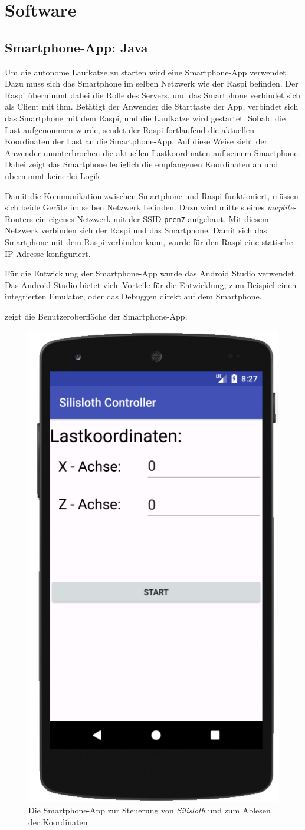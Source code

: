 \section{Software}

\subsection{Smartphone-App: Java}
\label{sec:smartphoneapp}

Um die autonome Laufkatze zu starten wird eine Smartphone-App verwendet. Dazu muss sich das Smartphone im selben Netzwerk wie der Raspi befinden. Der Raspi übernimmt dabei die Rolle des Servers, und das Smartphone verbindet sich als Client mit ihm. Betätigt der Anwender die Starttaste der App, verbindet sich das Smartphone mit dem Raspi, und die Laufkatze wird gestartet. Sobald die Last aufgenommen wurde, sendet der Raspi fortlaufend die aktuellen Koordinaten der Last an die Smartphone-App. Auf diese Weise sieht der Anwender ununterbrochen die aktuellen Lastkoordinaten auf seinem Smartphone. Dabei zeigt das Smartphone lediglich die empfangenen Koordinaten an und übernimmt keinerlei Logik.

Damit die Kommunikation zwischen Smartphone und Raspi funktioniert, müssen sich beide Geräte im selben Netzwerk befinden. Dazu wird mittels eines \textit{maplite}-Routers ein eigenes Netzwerk mit der SSID \texttt{pren7} aufgebaut. Mit diesem Netzwerk verbinden sich der Raspi und das Smartphone. Damit sich das Smartphone mit dem Raspi verbinden kann, wurde für den Raspi eine statische IP-Adresse konfiguriert.

Für die Entwicklung der Smartphone-App wurde das Android Studio verwendet. Das Android Studio bietet viele Vorteile für die Entwicklung, zum Beispiel einen integrierten Emulator, oder das Debuggen direkt auf dem Smartphone.

 zeigt die Benutzeroberfläche der Smartphone-App.

\begin{figure}[H]
    \centering
    \includegraphics[width=0.25\linewidth]{pics/smartphoneapp.png}
    \caption{Die Smartphone-App zur Steuerung von \textit{Silisloth} und zum Ablesen der Koordinaten}
    \label{fig:smartphoneapp}
\end{figure}


